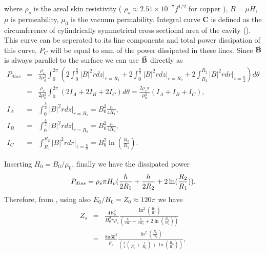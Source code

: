 \documentclass[a4paper,oneside,12pt]{report}
\numberwithin{equation}{chapter}
\begin{document}
\vspace{-30pt}
\noindent
where $\rho_s$ is the areal skin resistivity ( $\rho_s \approx 2.51 \times 10^{-7} f^{1/2}$ for copper \cite{rhodo_pottier} ), $B=\mu H$, $\mu$ is permeability, $\mu_0$ is the vacuum permability. 
Integral curve \textbf{C} is defined as the circumference of cylindrically symmetrical cross sectional area of the cavity ().
This curve can be seperated to its line components and total power dissipation of this curve, $P_C$ will be equal to sum of the power dissipated in these lines.
Since $\vec{\textbf{B}}$ is always parallel to the surface we can use $\vec{\textbf{B}}$ directly as
\vspace{-10pt}
\begin{eqnarray}
    P_{diss} &=& \frac{\rho_s}{2\mu_0^2} \int_0^{2\pi} (
                   2\int_{0}^{\frac{h}{2}} |B|^2 r dz \Big|_{r=R_1}
                 + 2\int_{0}^{\frac{h}{2}} |B|^2 r dz \Big|_{r=R_2} 
                 + 2\int_{R_1}^{R_2} |B|^2 r dr \Big|_{z=\frac{h}{2}})d\theta \nonumber\\
             &=& \frac{\rho_s}{2\mu_0^2} \int_0^{2\pi} (2I_A + 2I_B + 2I_C)d\theta 
                 = \frac{2\rho_s \pi}{\mu_0^2}(I_A + I_B + I_C)   ,\\
    I_A &=& \int_{0}^{\frac{h}{2}} |B|^2 r dz \Big|_{r=R_1} = B_0^2 \frac{h}{4R_1}   ,\\
    I_B &=& \int_{0}^{\frac{h}{2}} |B|^2 r dz \Big|_{r=R_2} = B_0^2 \frac{h}{4R_2}   ,\\
    I_C &=& \int_{R_1}^{R_2} |B|^2 r dr \Big|_{z=\frac{h}{2}} = B_0^2 \ln(\frac{R_2}{R_1}) .
\end{eqnarray}

\vspace{-30pt}
\noindent
Inserting $H_0=B_0/\mu_0$, finally we have the dissipated power
\vspace{-10pt}\begin{equation} \label{eq:p_diss}
    P_{diss} = \rho_s \pi H_o ( \frac{h}{2R_1} + \frac{h}{2R_2} + 2\ln(\frac{R_2}{R_1}) ).
\vspace{-10pt}\end{equation}
Therefore, from , using  also $E_0/H_0 = Z_0 \approx 120 \pi$ we have
\vspace{-10pt}
\begin{eqnarray}
    Z_s &=& \frac{4E_0^2}{H_0^2 \pi \rho_s} \frac{ \ln^2(\frac{R_2}{R_1})}{(\frac{h}{2R_1} + \frac{h}{2R_2} + 2 \ln(\frac{R_2}{R_1}))} \nonumber\\
        &=& \frac{8 \pi 60^2}{\rho_s} \frac{ \ln^2(\frac{R_2}{R_1})}{(\frac{h}{4}(\frac{1}{R_1} + \frac{1}{R_2}) + \ln(\frac{R_2}{R_1}))}   ,
\end{eqnarray}
\end{document}
